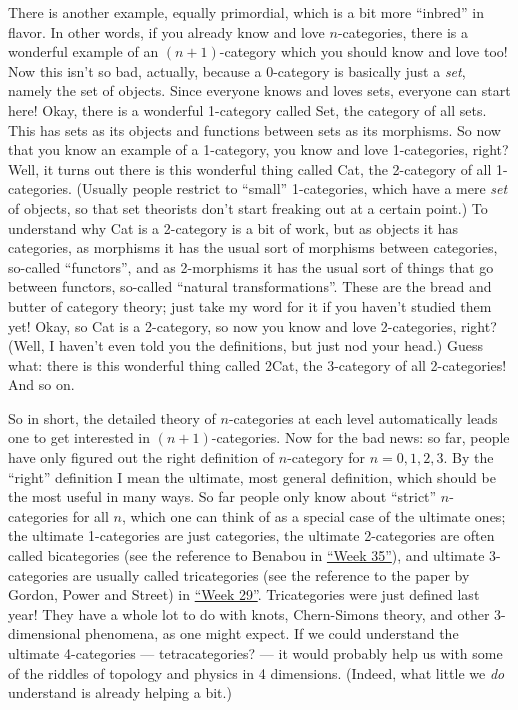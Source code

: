 \documentclass{article}
\begin{document}
There is another example, equally primordial, which is a bit more
``inbred'' in flavor. In other words, if you already know and love
\(n\)-categories, there is a wonderful example of an \((n+1)\)-category
which you should know and love too! Now this isn't so bad, actually,
because a 0-category is basically just a \emph{set}, namely the set of
objects. Since everyone knows and loves sets, everyone can start here!
Okay, there is a wonderful 1-category called Set, the category of all
sets. This has sets as its objects and functions between sets as its
morphisms. So now that you know an example of a 1-category, you know and
love 1-categories, right? Well, it turns out there is this wonderful
thing called Cat, the 2-category of all 1-categories. (Usually people
restrict to ``small'' 1-categories, which have a mere \emph{set} of
objects, so that set theorists don't start freaking out at a certain
point.) To understand why Cat is a 2-category is a bit of work, but as
objects it has categories, as morphisms it has the usual sort of
morphisms between categories, so-called ``functors'', and as 2-morphisms
it has the usual sort of things that go between functors, so-called
``natural transformations''. These are the bread and butter of category
theory; just take my word for it if you haven't studied them yet! Okay,
so Cat is a 2-category, so now you know and love 2-categories, right?
(Well, I haven't even told you the definitions, but just nod your head.)
Guess what: there is this wonderful thing called 2Cat, the 3-category of
all 2-categories! And so on.

So in short, the detailed theory of \(n\)-categories at each level
automatically leads one to get interested in \((n+1)\)-categories. Now
for the bad news: so far, people have only figured out the right
definition of \(n\)-category for \(n = 0, 1, 2, 3\). By the ``right''
definition I mean the ultimate, most general definition, which should be
the most useful in many ways. So far people only know about ``strict''
\(n\)-categories for all \(n\), which one can think of as a special case
of the ultimate ones; the ultimate 1-categories are just categories, the
ultimate 2-categories are often called bicategories (see the reference
to Benabou in \protect\hyperlink{week35}{``Week 35''}), and ultimate
3-categories are usually called tricategories (see the reference to the
paper by Gordon, Power and Street) in \protect\hyperlink{week29}{``Week
29''}. Tricategories were just defined last year! They have a whole lot
to do with knots, Chern-Simons theory, and other 3-dimensional
phenomena, as one might expect. If we could understand the ultimate
4-categories --- tetracategories? --- it would probably help us with
some of the riddles of topology and physics in 4 dimensions. (Indeed,
what little we \emph{do} understand is already helping a bit.)
\end{document}
